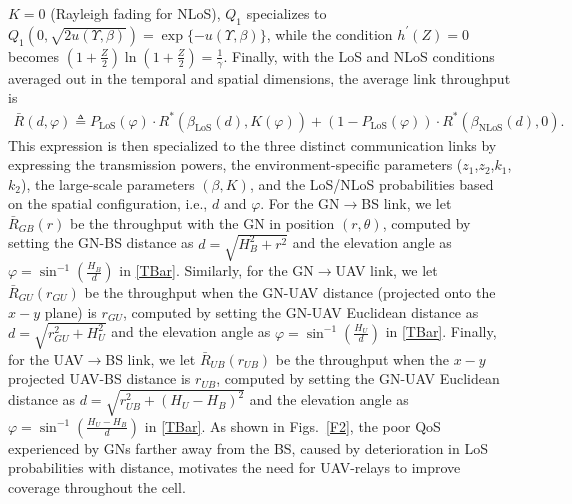 \documentclass[12pt, draftcls, onecolumn]{IEEEtran}
\theoremstyle{plain}
\theoremstyle{definition}
\theoremstyle{remark}
\begin{document}
 $K{=}0$ (Rayleigh fading for NLoS), $Q_1$ specializes to $Q_{1}(0,\sqrt{2u(\Upsilon,\beta)}){=}\exp\{-u(\Upsilon,\beta)\}$, while the condition $h^\prime(Z){=}0$ becomes $(1{+}\frac{Z}{2})\ln(1{+}\frac{Z}{2}){=}\frac{1}{\gamma}$. Finally, with the LoS and NLoS conditions averaged out in the temporal and spatial dimensions, the average link throughput is \pagebreak
\begin{align}\label{TBar}
	\bar{R}(d,\varphi) \triangleq P_{\mathrm{LoS}}(\varphi) \cdot R^{*}(\beta_{\mathrm{LoS}}(d), K(\varphi)) + (1 - P_{\mathrm{LoS}}(\varphi)) \cdot R^{*}(\beta_{\mathrm{NLoS}}(d), 0).
\end{align}
This expression is then specialized to the three distinct communication links by expressing the transmission powers, the environment-specific parameters ($z_{1}$,$z_{2}$,$k_{1}$,$k_{2}$), the large-scale parameters $(\beta,K)$, and the LoS/NLoS probabilities based on the spatial configuration, i.e., $d$ and $\varphi$. For the GN$\rightarrow$BS link, we let $\bar{R}_{GB}(r)$ be the throughput with the GN in position $(r,\theta)$, computed by setting the GN-BS distance as $d{=}\sqrt{H_{B}^{2}{+}r^{2}}$ and the elevation angle as $\varphi{=}\sin^{-1}\left(\frac{H_{B}}{d}\right)$ in \eqref{TBar}. Similarly, for the GN$\rightarrow$UAV link, we let $\bar{R}_{GU}(r_{GU})$ be the throughput when the GN-UAV distance (projected onto the $x{-}y$ plane) is $r_{GU}$, computed by setting the GN-UAV Euclidean distance as $d{=}\sqrt{r_{GU}^{2}{+}H_{U}^{2}}$ and the elevation angle as $\varphi{=}\sin^{-1}\left(\frac{H_{U}}{d}\right)$ in \eqref{TBar}. Finally, for the UAV$\rightarrow$BS link, we let $\bar{R}_{UB}(r_{UB})$ be the throughput when the $x{-}y$ projected UAV-BS distance is $r_{UB}$, computed by setting the GN-UAV Euclidean distance as $d{=}\sqrt{r_{UB}^{2}{+}(H_{U}{-}H_{B})^{2}}$ and the elevation angle as $\varphi{=}\sin^{-1}\left(\frac{H_{U}{-}H_{B}}{d}\right)$ in \eqref{TBar}. As shown in Figs.~\ref{F2}, the poor QoS experienced by GNs farther away from the BS, caused by deterioration in LoS probabilities with distance, motivates the need for UAV-relays to improve coverage throughout the cell.
\end{document}
